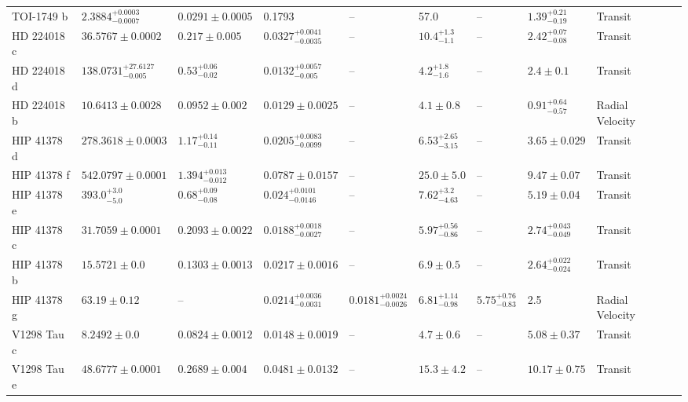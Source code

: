 \begin{tabular}{llllllllll}
TOI-1749 b & $2.3884^{+0.0003}_{-0.0007}$ & $0.0291 \pm 0.0005$ & 0.1793 & -- & 57.0 & -- & $1.39^{+0.21}_{-0.19}$ & Transit & \cite{FUKUI_ET_AL__2021} \\
HD 224018 c & $36.5767 \pm 0.0002$ & $0.217 \pm 0.005$ & $0.0327^{+0.0041}_{-0.0035}$ & -- & $10.4^{+1.3}_{-1.1}$ & -- & $2.42^{+0.07}_{-0.08}$ & Transit & \cite{DAMASSO_ET_AL_2025} \\
HD 224018 d & $138.0731^{+27.6127}_{-0.005}$ & $0.53^{+0.06}_{-0.02}$ & $0.0132^{+0.0057}_{-0.005}$ & -- & $4.2^{+1.8}_{-1.6}$ & -- & $2.4 \pm 0.1$ & Transit & \cite{DAMASSO_ET_AL_2025} \\
HD 224018 b & $10.6413 \pm 0.0028$ & $0.0952 \pm 0.002$ & $0.0129 \pm 0.0025$ & -- & $4.1 \pm 0.8$ & -- & $0.91^{+0.64}_{-0.57}$ & Radial Velocity & \cite{DAMASSO_ET_AL_2025} \\
HIP 41378 d & $278.3618 \pm 0.0003$ & $1.17^{+0.14}_{-0.11}$ & $0.0205^{+0.0083}_{-0.0099}$ & -- & $6.53^{+2.65}_{-3.15}$ & -- & $3.65 \pm 0.029$ & Transit & \cite{GROUFFAL_ET_AL_2026} \\
HIP 41378 f & $542.0797 \pm 0.0001$ & $1.394^{+0.013}_{-0.012}$ & $0.0787 \pm 0.0157$ & -- & $25.0 \pm 5.0$ & -- & $9.47 \pm 0.07$ & Transit & \cite{GROUFFAL_ET_AL_2026} \\
HIP 41378 e & $393.0^{+3.0}_{-5.0}$ & $0.68^{+0.09}_{-0.08}$ & $0.024^{+0.0101}_{-0.0146}$ & -- & $7.62^{+3.2}_{-4.63}$ & -- & $5.19 \pm 0.04$ & Transit & \cite{GROUFFAL_ET_AL_2026} \\
HIP 41378 c & $31.7059 \pm 0.0001$ & $0.2093 \pm 0.0022$ & $0.0188^{+0.0018}_{-0.0027}$ & -- & $5.97^{+0.56}_{-0.86}$ & -- & $2.74^{+0.043}_{-0.049}$ & Transit & \cite{GROUFFAL_ET_AL_2026} \\
HIP 41378 b & $15.5721 \pm 0.0$ & $0.1303 \pm 0.0013$ & $0.0217 \pm 0.0016$ & -- & $6.9 \pm 0.5$ & -- & $2.64^{+0.022}_{-0.024}$ & Transit & \cite{GROUFFAL_ET_AL_2026} \\
HIP 41378 g & $63.19 \pm 0.12$ & -- & $0.0214^{+0.0036}_{-0.0031}$ & $0.0181^{+0.0024}_{-0.0026}$ & $6.81^{+1.14}_{-0.98}$ & $5.75^{+0.76}_{-0.83}$ & 2.5 & Radial Velocity & \cite{GROUFFAL_ET_AL_2026} \\
V1298 Tau c & $8.2492 \pm 0.0$ & $0.0824 \pm 0.0012$ & $0.0148 \pm 0.0019$ & -- & $4.7 \pm 0.6$ & -- & $5.08 \pm 0.37$ & Transit & \cite{LIVINGSTON_ET_AL_2026} \\
V1298 Tau e & $48.6777 \pm 0.0001$ & $0.2689 \pm 0.004$ & $0.0481 \pm 0.0132$ & -- & $15.3 \pm 4.2$ & -- & $10.17 \pm 0.75$ & Transit & \cite{LIVINGSTON_ET_AL_2026} \\

\end{tabular}

